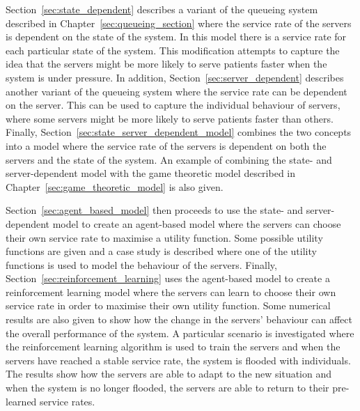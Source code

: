 Section~\ref{sec:state_dependent} describes a variant of the queueing system
described in Chapter~\ref{sec:queueing_section} where the service rate of the
servers is dependent on the state of the system.
In this model there is a service rate for each particular state of the system.
This modification attempts to capture the idea that the servers might be more
likely to serve patients faster when the system is under pressure.
In addition, Section~\ref{sec:server_dependent} describes another variant of
the queueing system where the service rate can be dependent on the server.
This can be used to capture the individual behaviour of servers, where some
servers might be more likely to serve patients faster than others.
Finally, Section~\ref{sec:state_server_dependent_model} combines the two
concepts into a model where the service rate of the servers is dependent on
both the servers and the state of the system.
An example of combining the state- and server-dependent model with the game
theoretic model described in Chapter~\ref{sec:game_theoretic_model} is also
given.

Section~\ref{sec:agent_based_model} then proceeds to use the state- and
server-dependent model to create an agent-based model where the servers can
choose their own service rate to maximise a utility function.
Some possible utility functions are given and a case study is described where
one of the utility functions is used to model the behaviour of the servers.
Finally, Section~\ref{sec:reinforcement_learning} uses the agent-based model
to create a reinforcement learning model where the servers can learn to choose
their own service rate in order to maximise their own utility function.
Some numerical results are also given to show how the change in the servers'
behaviour can affect the overall performance of the system.
A particular scenario is investigated where the reinforcement learning
algorithm is used to train the servers and when the servers have reached a
stable service rate, the system is flooded with individuals.
The results show how the servers are able to adapt to the new situation and
when the system is no longer flooded, the servers are able to return to their
pre-learned service rates.
